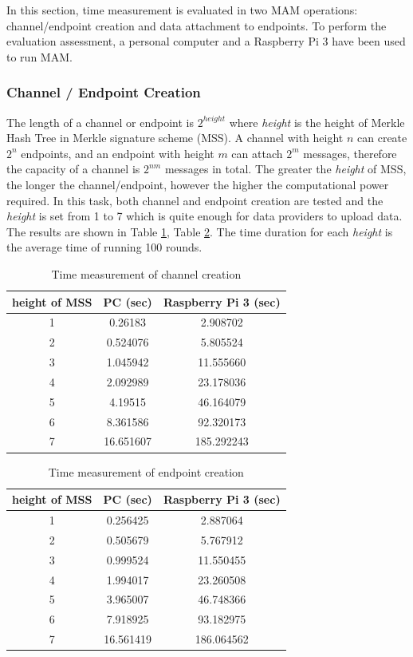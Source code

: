 \documentclass[journal,article,applsci,submit,moreauthors,pdftex]{Definitions/mdpi}
\begin{document}
In this section, time measurement is evaluated in two MAM operations: channel/endpoint creation and data attachment to endpoints. To perform the evaluation assessment, a personal computer and a Raspberry Pi 3 have been used to run MAM. 

\subsubsection{Channel / Endpoint Creation}
The length of a channel or endpoint is $2^{height}$ where \textit{height} is the height of Merkle Hash Tree in Merkle signature scheme (MSS). A channel with height $n$ can create $2^n$ endpoints, and an endpoint with height $m$ can attach $2^m$ messages, therefore the capacity of a channel is $2^{nm}$ messages in total. The greater the \textit{height} of MSS, the longer the channel/endpoint, however the higher the computational power required. In this task, both channel and endpoint creation are tested and the \textit{height} is set from 1 to 7 which is quite enough for data providers to upload data. The results are shown in Table \ref{tab:channel_create}, Table \ref{tab:endpoint_create}. The time duration for each \textit{height} is the average time of running 100 rounds.

\begin{table}[H]
	\caption{Time measurement of channel creation}
	\centering
	\label{tab:channel_create}
	\begin{tabular}{ccc}
	\toprule
		\textbf{height of MSS} & \textbf{PC (sec)} & \textbf{Raspberry Pi 3 (sec)} \\ 
		\midrule
		1 & 0.26183 & 2.908702 \\ 
		2 & 0.524076 & 5.805524 \\ 
		3 & 1.045942 & 11.555660 \\ 
		4 & 2.092989 & 23.178036 \\ 
		5 & 4.19515 & 46.164079\\ 
		6 & 8.361586 & 92.320173\\ 
		7 & 16.651607 & 185.292243\\
		\bottomrule
	\end{tabular}
\end{table}

\begin{table}[H]
	\caption{Time measurement of endpoint creation}
	\centering
	\label{tab:endpoint_create}
	\begin{tabular}{ccc}
	\toprule
		\textbf{height of MSS} & \textbf{PC (sec)} & \textbf{Raspberry Pi 3 (sec)} \\ 
		\midrule
		1 & 0.256425 & 2.887064 \\ 
		2 & 0.505679 & 5.767912 \\ 
		3 & 0.999524 & 11.550455 \\ 
		4 & 1.994017 & 23.260508 \\ 
		5 & 3.965007 & 46.748366 \\ 
		6 & 7.918925 & 93.182975 \\ 
		7 & 16.561419 & 186.064562 \\
		\bottomrule
	\end{tabular}
\end{table}
\end{document}

